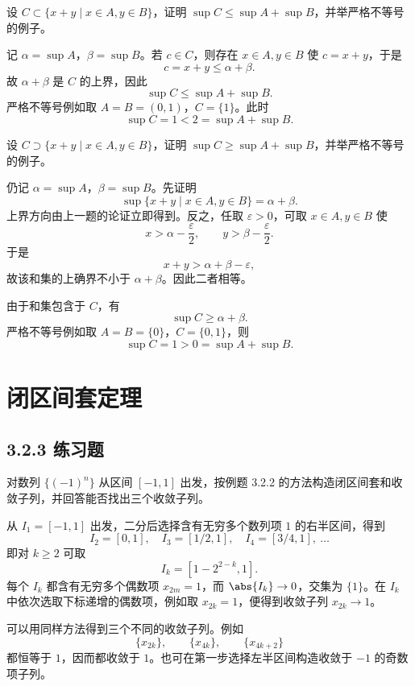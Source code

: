 \begin{xexercise}[3.1.3 练习题 8]
设 $C\subset\{x+y\mid x\in A,y\in B\}$，证明 $\sup C\leqslant\sup A+\sup B$，并举严格不等号的例子。
\end{xexercise}
\begin{xsolution}
记 $\alpha=\sup A$，$\beta=\sup B$。若 $c\in C$，则存在 $x\in A,y\in B$ 使 $c=x+y$，于是
\[
  c=x+y\leqslant\alpha+\beta.
\]
故 $\alpha+\beta$ 是 $C$ 的上界，因此
\[
  \sup C\leqslant\sup A+\sup B.
\]
严格不等号例如取 $A=B=(0,1)$，$C=\{1\}$。此时
\[
  \sup C=1<2=\sup A+\sup B.
\]
\end{xsolution}

\begin{xexercise}[3.1.3 练习题 9]
设 $C\supset\{x+y\mid x\in A,y\in B\}$，证明 $\sup C\geqslant\sup A+\sup B$，并举严格不等号的例子。
\end{xexercise}
\begin{xsolution}
仍记 $\alpha=\sup A$，$\beta=\sup B$。先证明
\[
  \sup\{x+y\mid x\in A,y\in B\}=\alpha+\beta.
\]
上界方向由上一题的论证立即得到。反之，任取 $\varepsilon>0$，可取 $x\in A,y\in B$ 使
\[
  x>\alpha-\frac\varepsilon2,
  \qquad
  y>\beta-\frac\varepsilon2.
\]
于是
\[
  x+y>\alpha+\beta-\varepsilon,
\]
故该和集的上确界不小于 $\alpha+\beta$。因此二者相等。

由于和集包含于 $C$，有
\[
  \sup C\geqslant\alpha+\beta.
\]
严格不等号例如取 $A=B=\{0\}$，$C=\{0,1\}$，则
\[
  \sup C=1>0=\sup A+\sup B.
\]
\end{xsolution}

\section{闭区间套定理}
\subsection*{3.2.3 练习题}

\begin{xexercise}[3.2.3 练习题 1]
对数列 $\{(-1)^n\}$ 从区间 $[-1,1]$ 出发，按例题 3.2.2 的方法构造闭区间套和收敛子列，并回答能否找出三个收敛子列。
\end{xexercise}
\begin{xsolution}
从 $I_1=[-1,1]$ 出发，二分后选择含有无穷多个数列项 $1$ 的右半区间，得到
\[
  I_2=[0,1],\quad I_3=[1/2,1],\quad I_4=[3/4,1],\ \ldots
\]
即对 $k\geqslant2$ 可取
\[
  I_k=[1-2^{2-k},1].
\]
每个 $I_k$ 都含有无穷多个偶数项 $x_{2m}=1$，而 $\abs{I_k}\to0$，交集为 $\{1\}$。在 $I_k$ 中依次选取下标递增的偶数项，例如取 $x_{2k}=1$，便得到收敛子列 $x_{2k}\to1$。

可以用同样方法得到三个不同的收敛子列。例如
\[
  \{x_{2k}\},\qquad \{x_{4k}\},\qquad \{x_{4k+2}\}
\]
都恒等于 $1$，因而都收敛于 $1$。也可在第一步选择左半区间构造收敛于 $-1$ 的奇数项子列。
\end{xsolution}


